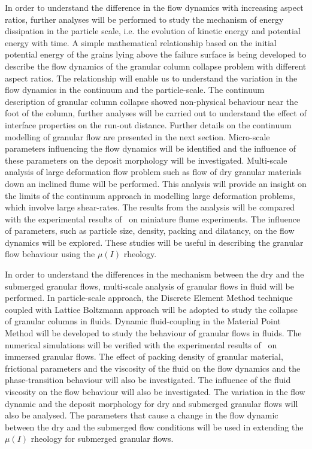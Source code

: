In order to understand the difference in the flow dynamics with increasing 
aspect ratios, further analyses will be performed to study the mechanism of 
energy dissipation in the particle scale, i.e. the evolution of kinetic energy 
and potential energy with time. A simple mathematical relationship based on the 
initial potential energy of the grains lying above the failure surface is being 
developed to describe the flow dynamics of the granular column collapse problem 
with different aspect ratios. The relationship will enable us to understand the 
variation in the flow dynamics in the continuum and the particle-scale. The 
continuum description of granular column collapse showed non-physical behaviour 
near the foot of the column, further analyses will be carried out to understand 
the effect of interface properties on the run-out distance. Further details on 
the continuum modelling of granular flow are presented in the next section. 
Micro-scale parameters influencing the flow dynamics will be identified and the 
influence of these parameters on the deposit morphology will be investigated. 
Multi-scale analysis of large deformation flow problem such as flow of dry 
granular materials down an inclined flume will be performed. This analysis will 
provide an insight on the limits of the continuum approach in modelling large 
deformation problems, which involve large shear-rates. The results from the 
analysis will be compared with the experimental results 
of~\citet{Denlinger2001} on miniature flume experiments. The influence of 
parameters, such as particle size, density, packing and dilatancy, on the flow 
dynamics will be explored. These studies will be useful in describing the 
granular flow behaviour using the $\mu(I)$ rheology.

In order to understand the differences in the mechanism between the dry and the 
submerged granular flows, multi-scale analysis of granular flows in fluid will 
be performed. In particle-scale approach, the Discrete Element Method technique 
coupled with Lattice Boltzmann approach will be adopted to study the collapse 
of granular columns in fluids. Dynamic fluid-coupling in the Material Point 
Method will be developed to study the behaviour of granular flows in fluids. 
The numerical simulations will be verified with the experimental results 
of~\cite{Cassar2005} on immersed granular flows. The effect of packing density 
of granular material, frictional parameters and the viscosity of the fluid on 
the flow dynamics and the phase-transition behaviour will also be investigated. 
The influence of the fluid viscosity on the flow behaviour will also be 
investigated. The variation in the flow dynamic and the deposit morphology for 
dry and submerged granular flows will also be analysed. The parameters that 
cause a change in the flow dynamic between the dry and the submerged flow 
conditions will be used in extending the $\mu(I)$ rheology for submerged 
granular flows. 


